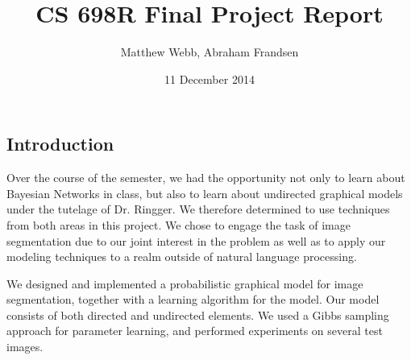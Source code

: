 \documentclass[12pt]{article}
\begin{document}
\title{CS 698R Final Project Report}
\author{Matthew Webb, Abraham Frandsen}
\date{11 December 2014}

\maketitle

\subsection*{Introduction}
Over the course of the semester, we had the opportunity not only to learn about
Bayesian Networks in class, but also to learn about undirected graphical models under
the tutelage of Dr. Ringger. We therefore determined to use techniques from both
areas in this project.
We chose to engage the task of image segmentation due to our joint interest in the problem
as well as to apply our modeling techniques to a realm outside of natural language processing.

We designed and implemented a probabilistic graphical model for image segmentation, together
with a learning algorithm for the model.
Our model consists of both directed and undirected elements.
We used a Gibbs sampling approach for parameter learning, and performed experiments on several
test images.
\end{document}
